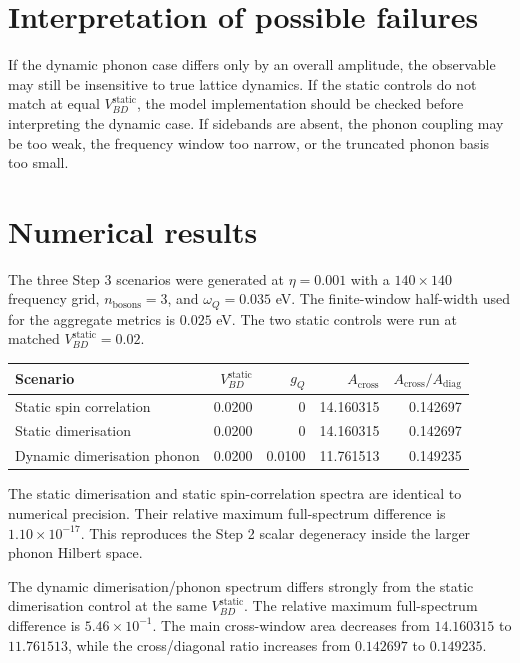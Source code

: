 \documentclass[11pt]{article}
\begin{document}
\section{Interpretation of possible failures}
If the dynamic phonon case differs only by an overall amplitude, the observable
may still be insensitive to true lattice dynamics.  If the static controls do
not match at equal $V_{BD}^{\mathrm{static}}$, the model implementation should
be checked before interpreting the dynamic case.  If sidebands are absent, the
phonon coupling may be too weak, the frequency window too narrow, or the
truncated phonon basis too small.

\section{Numerical results}
The three Step 3 scenarios were generated at $\eta=0.001$ with a
$140\times140$ frequency grid, $n_{\mathrm{bosons}}=3$, and
$\omega_Q=0.035$ eV.  The finite-window half-width used for the aggregate
metrics is $0.025$ eV.  The two static controls were run at matched
$V_{BD}^{\mathrm{static}}=0.02$.

\begin{center}
\begin{tabular}{lrrrr}
\toprule
Scenario & $V_{BD}^{\mathrm{static}}$ & $g_Q$ &
$A_{\mathrm{cross}}$ & $A_{\mathrm{cross}}/A_{\mathrm{diag}}$ \\
\midrule
Static spin correlation & 0.0200 & 0 & 14.160315 & 0.142697 \\
Static dimerisation & 0.0200 & 0 & 14.160315 & 0.142697 \\
Dynamic dimerisation phonon & 0.0200 & 0.0100 & 11.761513 & 0.149235 \\
\bottomrule
\end{tabular}
\end{center}

The static dimerisation and static spin-correlation spectra are identical to
numerical precision.  Their relative maximum full-spectrum difference is
$1.10\times10^{-17}$.  This reproduces the Step 2 scalar degeneracy inside the
larger phonon Hilbert space.

The dynamic dimerisation/phonon spectrum differs strongly from the static
dimerisation control at the same $V_{BD}^{\mathrm{static}}$.  The relative
maximum full-spectrum difference is $5.46\times10^{-1}$.  The main cross-window
area decreases from $14.160315$ to $11.761513$, while the cross/diagonal ratio
increases from $0.142697$ to $0.149235$.
\end{document}

